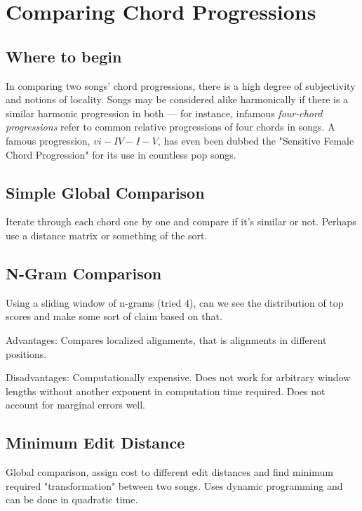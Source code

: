 \section{Comparing Chord Progressions}

\subsection{Where to begin}

In comparing two songs' chord progressions, there is a high degree of subjectivity and notions of locality. Songs may be considered alike harmonically if there is a similar harmonic progression in both --- for instance, infamous \textit{four-chord progressions} refer to common relative progressions of four chords in songs. A famous progression, $vi-IV-I-V$, has even been dubbed the "Sensitive Female Chord Progression" for its use in countless pop songs\cite{hirsh2008}.

\subsection{Simple Global Comparison}

\item Iterate through each chord one by one and compare if it's similar or not. Perhaps use a distance matrix or something of the sort.

\subsection{N-Gram Comparison}

\item Using a sliding window of n-grams (tried 4), can we see the distribution of top scores and make some sort of claim based on that.

\item Advantages: Compares localized alignments, that is alignments in different positions.

\item Disadvantages: Computationally expensive. Does not work for arbitrary window lengths without another exponent in computation time required. Does not account for marginal errors well.

\subsection{Minimum Edit Distance}

\item Global comparison, assign cost to different edit distances and find minimum required "transformation" between two songs. Uses dynamic programming and can be done in quadratic time.

